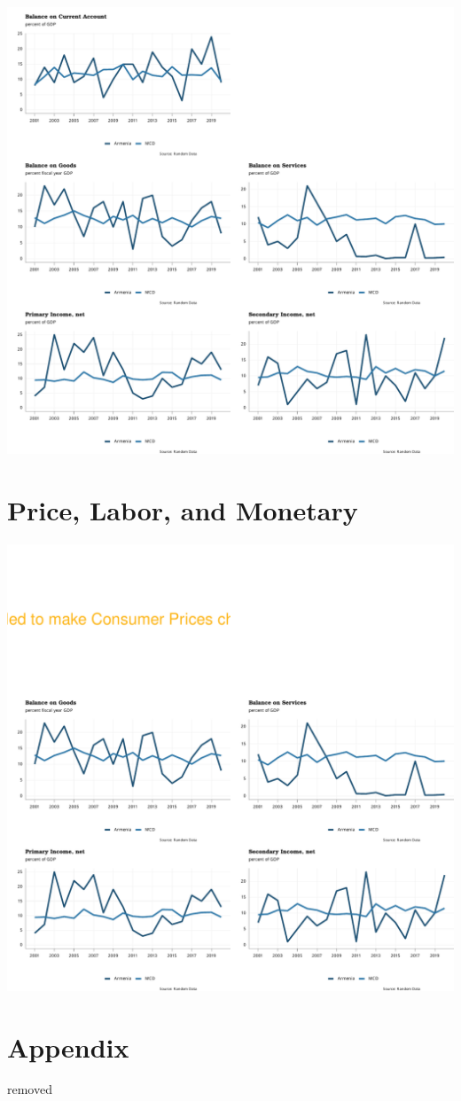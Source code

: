 \documentclass[
]{article}
\begin{document}
\begin{center}\includegraphics{RandomData_MCD__files/figure-latex/current_account-1} \end{center}

\newpage

\hypertarget{price-labor-and-monetary}{%
\section{Price, Labor, and Monetary}\label{price-labor-and-monetary}}

\begin{center}\includegraphics{RandomData_MCD__files/figure-latex/plm-1} \end{center}

\newpage

\hypertarget{appendix}{%
\section{Appendix}\label{appendix}}

removed
\end{document}
